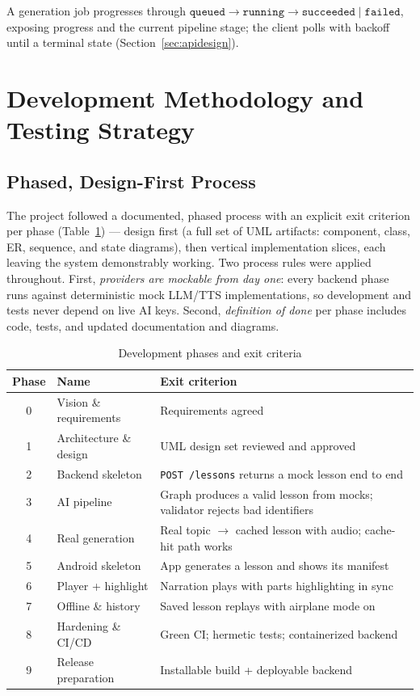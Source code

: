 A generation job progresses through
$\texttt{queued} \to \texttt{running} \to \texttt{succeeded} \mid
\texttt{failed}$, exposing progress and the current pipeline stage; the
client polls with backoff until a terminal state
(Section~\ref{sec:apidesign}).

\section{Development Methodology and Testing Strategy}
\label{sec:sdlc}

\subsection{Phased, Design-First Process}

The project followed a documented, phased process with an explicit exit
criterion per phase (Table~\ref{tab:phases}) --- design first (a full set of
UML artifacts: component, class, ER, sequence, and state diagrams), then
vertical implementation slices, each leaving the system demonstrably working.
Two process rules were applied throughout. First, \emph{providers are
mockable from day one}: every backend phase runs against deterministic mock
LLM/TTS implementations, so development and tests never depend on live AI
keys. Second, \emph{definition of done} per phase includes code, tests, and
updated documentation and diagrams.

\begin{table}[htbp]
\caption{Development phases and exit criteria}
\label{tab:phases}
\centering
\small
\renewcommand{\arraystretch}{1.3}
\begin{tabular}{@{}clp{}@{}}
\toprule
\textbf{Phase} & \textbf{Name} & \textbf{Exit criterion}\\
\midrule
0 & Vision \& requirements & Requirements agreed\\
1 & Architecture \& design & UML design set reviewed and approved\\
2 & Backend skeleton & \texttt{POST /lessons} returns a mock lesson end to end\\
3 & AI pipeline & Graph produces a valid lesson from mocks; validator rejects
bad identifiers\\
4 & Real generation & Real topic $\to$ cached lesson with audio; cache-hit
path works\\
5 & Android skeleton & App generates a lesson and shows its manifest\\
6 & Player + highlight & Narration plays with parts highlighting in sync\\
7 & Offline \& history & Saved lesson replays with airplane mode on\\
8 & Hardening \& CI/CD & Green CI; hermetic tests; containerized backend\\
9 & Release preparation & Installable build + deployable backend\\
\bottomrule
\end{tabular}
\end{table}

